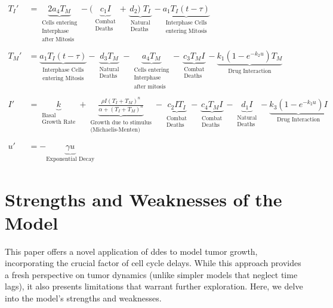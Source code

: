 \begin{align*}
    T_I' &= \underbrace{2a_4T_M}_{\substack{\text{Cells entering} \\ \text{Interphase} \\ \text{after Mitosis}}}-(\underbrace{c_1I}_{\substack{\text{Combat}\\\text{Deaths}}} + \underbrace{d_2)\;T_I}_{\substack{\text{Natural}\\\text{Deaths}}}- \underbrace{a_1T_I(t-\tau)}_{\substack{\text{Interphase Cells}\\ \text{entering Mitosis}}}\\
    \\
    T_M' &= \underbrace{a_1T_I(t-\tau)}_{\substack{\text{Interphase Cells}\\ \text{entering Mitosis}}}- \underbrace{d_3T_M}_{\substack{\text{Natural}\\\text{Deaths}}} - \underbrace{a_4T_M}_{\substack{\text{Cells entering} \\ \text{Interphase} \\ \text{after mitosis}}} - \underbrace{c_3T_MI}_{\substack{\text{Combat}\\\text{Deaths}}}- \underbrace{k_1(1-e^{-k_2u})T_M}_{\text{Drug Interaction}}\\
    \\
    I' &= \underbrace{k}_{\substack{\text{Basal}\\\text{Growth Rate}}} + \underbrace{\frac{\rho I (T_I + T_M)^n}{\alpha + (T_I + T_M)^n}}_{\substack{\text{Growth due to stimulus}\\\text{(Michaelis-Menten)}}} - \underbrace{c_2IT_I}_{\substack{\text{Combat}\\\text{Deaths}}} - \underbrace{c_4T_MI}_{\substack{\text{Combat}\\\text{Deaths}}} - \underbrace{d_1I}_{\substack{\text{Natural}\\\text{Deaths}}} - \underbrace{k_3(1-e^{-k_2u})I}_{\text{Drug Interaction}}\\
    \\
    u' &= -\underbrace{\gamma u}_{\text{Exponential Decay}}
\end{align*}

\section{Strengths and Weaknesses of the Model}

This paper offers a novel application of \gls{dde}s to model tumor growth, incorporating the crucial factor of cell cycle delays. While this approach provides a fresh perspective on tumor dynamics (unlike simpler models that neglect time lags), it also presents limitations that warrant further exploration. Here, we delve into the model's strengths and weaknesses.

